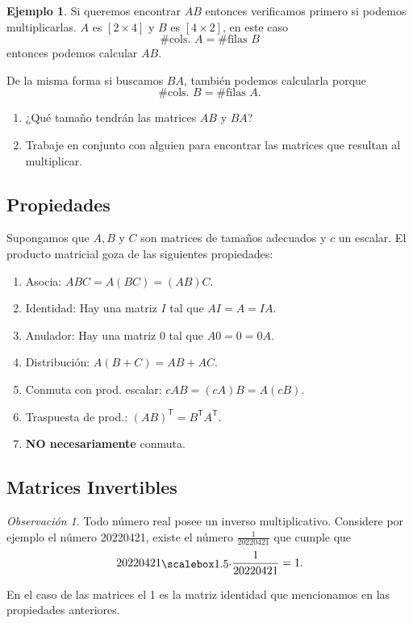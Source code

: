 \documentclass[12pt]{article}
\theoremstyle{plain}
\theoremstyle{definition}
\newtheorem{Ex}[Th]{Ejemplo}           %
\theoremstyle{remark}
\newtheorem*{Rmk}{Observación}      %
\newcommand{\sT}{\mathsf{T}}            %
\newcommand{\x}{\times}             %
\renewcommand{\:}{\colon}           %
\renewcommand{\.}{\Cdot}                %
\begin{document}
\begin{multicols}{2}
\begin{Ex}
Si queremos encontrar $AB$ entonces verificamos primero si podemos multiplicarlas. $A$ es $[2\x 4]$ y $B$ es $[4\x 2]$, en este caso 
$$\#\text{cols. } A = \#\text{filas }B$$ 
entonces podemos calcular $AB$.\par 
De la misma forma si buscamos $BA$, también podemos calcularla porque 
$$\#\text{cols. } B = \#\text{filas }A.$$ 
\end{Ex}

\begin{ptcbP}
  \begin{enumerate}
    \item ¿Qué tamaño tendrán las matrices $AB$ y $BA$?
    \item Trabaje en conjunto con alguien para encontrar las matrices que resultan al multiplicar.
  \end{enumerate}
\end{ptcbP}
\vspace{5cm}
\subsection*{Propiedades}
Supongamos que $A,B$ y $C$ son matrices de tamaños adecuados y $c$ un escalar. El producto matricial goza de las siguientes propiedades:
\begin{enumerate}
  \item Asocia: $ABC=A(BC)=(AB)C$.
  \item Identidad: Hay una matriz $I$ tal que $AI=A=IA$. 
  \item Anulador: Hay una matriz $0$ tal que $A0=0=0A$.
  \item Distribución: $A(B+C)=AB+AC$.
  \item Conmuta con prod. escalar: $cAB=(cA)B=A(cB)$.
  \item Traspuesta de prod.: $(AB)^\sT=B^\sT A^\sT$.
  \item \textbf{NO necesariamente} conmuta.
\end{enumerate}
\newpage
\subsection*{Matrices Invertibles}

\begin{Rmk}
  Todo número real posee un inverso multiplicativo. Considere por ejemplo el número 20220421, existe el número $\frac{1}{20220421}$ que cumple que 
  $$20220421\.\frac{1}{20220421}=1.$$
\end{Rmk}

En el caso de las matrices el 1 es la matriz identidad que mencionamos en las propiedades anteriores.


\end{multicols}
\end{document}
